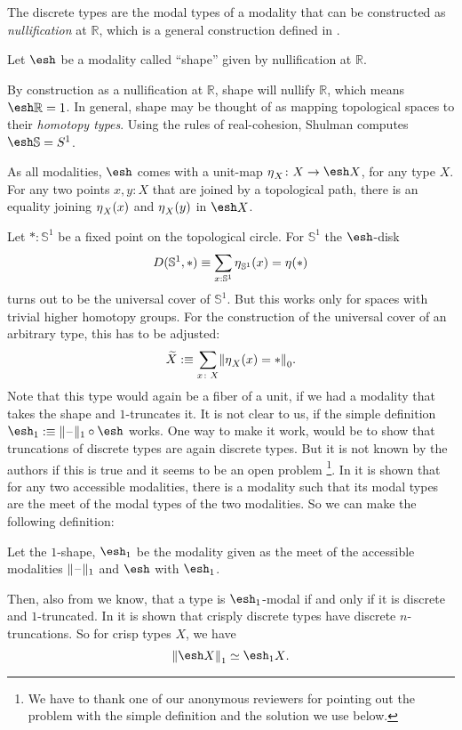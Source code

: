 \documentclass[9pt,twosided]{amsart}
\newcommand{\shape}{\ensuremath{\mathord{\raisebox{0.5pt}{\text{\rm\esh}}}}}
\newcommand{\bR}{\mathbb R}
\newcommand{\bS}{\mathbb S}
\begin{document}
The discrete types are the modal types of a modality that can be constructed as \emph{nullification} at $\bR$,
which is a general construction defined in \cite[Section 2.3]{RijkeSpittersShulman}.
\begin{defn}
  Let $\shape$ be a modality called ``shape'' given by nullification at $\bR$.
\end{defn}
By construction as a nullification at $\bR$, shape will nullify $\bR$, which means $\shape \bR=1$. 
In general, shape may be thought of as mapping topological spaces to their \emph{homotopy types}.
Using the rules of real-cohesion, Shulman computes $\shape \bS =\sphere{1}$.

As all modalities, $\shape$ comes with a unit-map $\modalunit_X\colon X \to \shape X$, for any type $X$.
For any two points $x,y: X$ that are joined by a topological path, 
there is an equality joining ${\eta_{}}_X(x)$ and ${\eta_{}}_X(y)$ in $\shape X$.

Let $\ast:\bS^1$ be a fixed point on the topological circle.
For $\bS^{1}$ the $\shape$-disk
\[ D (\bS^1,\ast) \equiv \sum_{x:\bS^{1}}\modalunit_{\bS^{1}}(x)=\modalunit(\ast) \]
turns out to be the universal cover of $\bS^{1}$.
But this works only for spaces with trivial higher homotopy groups. 
For the construction of the universal cover of an arbitrary type, this has to be adjusted:
\[ \widetilde{X}:\equiv \sum_{x\colon X} \trunc{0}{\modalunit_X(x)=\ast}. \]
Note that this type would again be a fiber of a unit, if we had a modality that takes the shape and $1$-truncates it.
It is not clear to us, if the simple definition $\shape_1:\equiv\trunc{1}{\blank}\circ\shape$ works.
One way to make it work, would be to show that truncations of discrete types are again discrete types.
But it is not known by the authors if this is true and it seems to be an open problem
\footnote{We have to thank one of our anonymous reviewers for pointing out the problem with the simple definition and the solution we use below.}.
In \cite[Theorem 3.28]{RijkeSpittersShulman} it is shown that for any two accessible modalities,
there is a modality such that its modal types are the meet of the modal types of the two modalities.
So we can make the following definition:
\begin{defn}
Let the $1$-shape, $\shape_1$ be the modality given as the meet of the accessible modalities $\trunc{1}{\blank}$ and $\shape$ with $\shape_1$.
\end{defn}
Then, also from \cite{RijkeSpittersShulman} we know, that a type is $\shape_1$-modal if and only if it is discrete and $1$-truncated.
In \cite[Theorem 6.21]{ShulmanRealCohesion} it is shown that crisply discrete types have discrete $n$-truncations.
So for crisp types $X$, we have
\[ \trunc{1}{\shape X} \simeq \shape_1 X\text{.} \]
\end{document}
